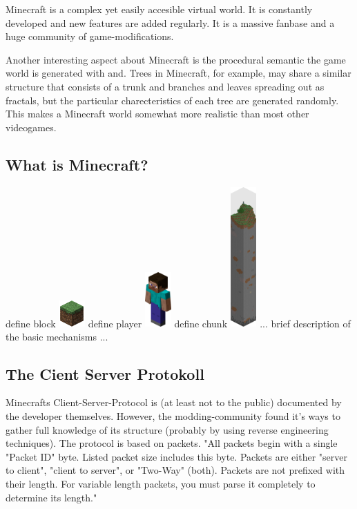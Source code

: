 Minecraft is a complex yet easily accesible virtual world. It is constantly developed and new features are added regularly. It is a massive fanbase and a huge community of game-modifications.

Another interesting aspect about Minecraft is the procedural semantic the game world is generated with and. Trees in Minecraft, for example, may share a similar structure that consists of a trunk and branches and leaves spreading out as fractals, but the particular charecteristics of each tree are generated randomly. This makes a Minecraft world somewhat more realistic than most other videogames.

        \subsection{What is Minecraft?}
define block
\includegraphics[width=1cm]{graphics/block}
define player
\includegraphics[width=1cm]{graphics/player}
define chunk
\includegraphics[width=1cm]{graphics/chunk}
... brief description of the basic mechanisms ...

        \subsection{The Cient Server Protokoll}
Minecrafts Client-Server-Protocol is (at least not to the public) documented by the developer themselves. However, the modding-community found it's ways to gather full knowledge of its structure (probably by using reverse engineering techniques). The protocol is based on packets. "All packets begin with a single "Packet ID" byte. Listed packet size includes this byte. Packets are either "server to client", "client to server", or "Two-Way" (both). Packets are not prefixed with their length. For variable length packets, you must parse it completely to determine its length." 

